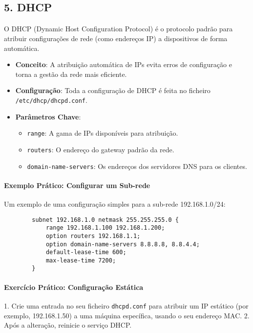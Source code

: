 \documentclass[10pt,a4paper]{article}
\begin{document}
	\subsection*{5. DHCP}
	\vspace{-1.2em}
	\paragraph{}
	O DHCP (Dynamic Host Configuration Protocol) é o protocolo padrão para atribuir configurações de rede (como endereços IP) a dispositivos de forma automática.
	
	\begin{itemize}
		\item \textbf{Conceito}: A atribuição automática de IPs evita erros de configuração e torna a gestão da rede mais eficiente.
		\item \textbf{Configuração}: Toda a configuração de DHCP é feita no ficheiro \texttt{/etc/dhcp/dhcpd.conf}.
		\item \textbf{Parâmetros Chave}:
		\begin{itemize}
			\item \texttt{range}: A gama de IPs disponíveis para atribuição.
			\item \texttt{routers}: O endereço do gateway padrão da rede.
			\item \texttt{domain-name-servers}: Os endereços dos servidores DNS para os clientes.
		\end{itemize}
	\end{itemize}
	
	\paragraph{\bfseries Exemplo Prático: Configurar um Sub-rede}
	Um exemplo de uma configuração simples para a sub-rede 192.168.1.0/24:
	
	\begin{verbatim}
		subnet 192.168.1.0 netmask 255.255.255.0 {
			range 192.168.1.100 192.168.1.200;
			option routers 192.168.1.1;
			option domain-name-servers 8.8.8.8, 8.8.4.4;
			default-lease-time 600;
			max-lease-time 7200;
		}
	\end{verbatim}
	
	
	\paragraph{\bfseries Exercício Prático: Configuração Estática}
	1. Crie uma entrada no seu ficheiro \texttt{dhcpd.conf} para atribuir um IP estático (por exemplo, 192.168.1.50) a uma máquina específica, usando o seu endereço MAC.
	2. Após a alteração, reinicie o serviço DHCP.
	
\end{document}
